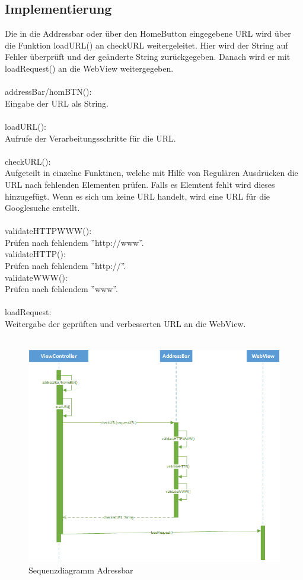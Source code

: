 \subsection{Implementierung}
Die in die Addressbar oder über den HomeButton eingegebene URL wird über die Funktion loadURL() an checkURL weitergeleitet.
Hier wird der String auf Fehler überprüft und der geänderte String zurückgegeben. Danach wird er mit loadRequest() an die
WebView weitergegeben.
\\\\
addressBar/homBTN():\\
Eingabe der URL als String.
\\\\
loadURL():\\
Aufrufe der Verarbeitungsschritte für die URL.
\\\\
checkURL():\\
Aufgeteilt in einzelne Funktinen, welche mit Hilfe von Regulären Ausdrücken die URL nach fehlenden Elementen prüfen.
Falls es Elemtent fehlt wird dieses hinzugefügt. Wenn es sich um keine URL handelt, wird eine URL für die Googlesuche erstellt.
\\\\
validateHTTPWWW():\\
Prüfen nach fehlendem ''http://www''.
\\
validateHTTP():\\
Prüfen nach fehlendem ''http://''.
\\
validateWWW():\\
Prüfen nach fehlendem ''www''.
\\\\
loadRequest:\\
Weitergabe der geprüften und verbesserten URL an die WebView.
\\\\
\begin{figure}[h]
	\includegraphics[width=\textwidth]{Pics/AddressCheck.png} 
	\caption{Sequenzdiagramm Adressbar}
	\label{fig:bild}
\end{figure}